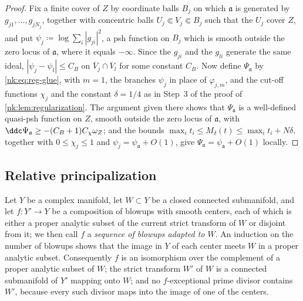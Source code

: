 \begin{proof}
Fix a finite cover of $Z$ by coordinate balls $B_j$ on which
$\mathfrak a$ is generated by $g_{j1},\dots,g_{jN_j}$, together with
concentric balls $U_j\Subset V_j\Subset B_j$ such that the $U_j$ cover
$Z$, and put $\psi_j\coloneqq \log\sum_i|g_{ji}|^2$, a psh function on $B_j$
which is smooth outside the zero locus of $\mathfrak a$, where it equals
$-\infty$. Since the $g_{ji}$ and the $g_{li}$ generate the same
ideal, $|\psi_j-\psi_l|\le C_B$ on $\overline V_j\cap\overline V_l$ for
some constant $C_B$. Now define $\Psi_{\mathfrak a}$ by
\eqref{nk:eq:reg-glue}, with $m=1$, the branches $\psi_j$ in place of
$\varphi_{j,m}$, and the cut-off functions $\chi_j$ and the constant
$\delta=1/4$ as in Step~3 of the proof of
\cref{nk:lem:regularization}. The argument given there shows that
$\Psi_{\mathfrak a}$ is a well-defined quasi-psh function on $Z$, smooth
outside the zero locus of $\mathfrak a$, with
$\ddc\Psi_{\mathfrak a}\ge-(C_B+1)C_\chi\omega_Z$; and the bounds
$\max_it_i\le M_\delta(t)\le\max_it_i+N\delta$, together with
$0\le\chi_j\le1$ and $\psi_j=\psi_{\mathfrak a}+O(1)$, give
$\Psi_{\mathfrak a}=\psi_{\mathfrak a}+O(1)$ locally.
\end{proof}

\subsection{Relative principalization}

Let $Y$ be a complex manifold, let $W\subset Y$ be a closed connected
submanifold, and let $f\colon Y'\to Y$ be a composition of blowups with
smooth centers, each of which is either a proper analytic subset of the
current strict transform of $W$ or disjoint from it; we then call $f$
a \emph{sequence of blowups adapted to $W$}. An induction on the
number of blowups shows that the image in $Y$ of each center meets
$W$ in a proper analytic subset. Consequently $f$ is an isomorphism
over the complement of a proper analytic subset of $W$; the strict
transform $W'$ of $W$ is a connected submanifold of $Y'$ mapping
onto $W$; and no $f$-exceptional prime divisor contains $W'$,
because every such divisor maps into the image of one of the centers.


